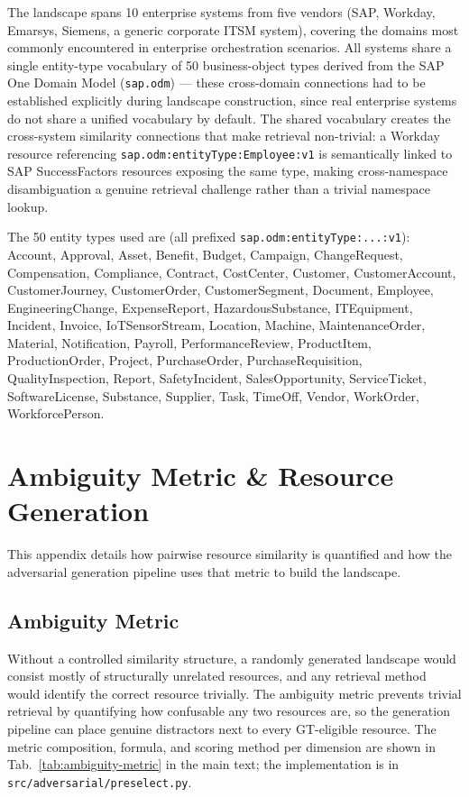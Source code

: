 The landscape spans 10 enterprise systems from five vendors (SAP, Workday, Emarsys, Siemens, a generic corporate ITSM system), covering the domains most commonly encountered in enterprise orchestration scenarios. All systems share a single entity-type vocabulary of 50 business-object types derived from the SAP One Domain Model (\texttt{sap.odm}) --- these cross-domain connections had to be established explicitly during landscape construction, since real enterprise systems do not share a unified vocabulary by default. The shared vocabulary creates the cross-system similarity connections that make retrieval non-trivial: a Workday resource referencing \texttt{sap.odm:entityType:Employee:v1} is semantically linked to SAP SuccessFactors resources exposing the same type, making cross-namespace disambiguation a genuine retrieval challenge rather than a trivial namespace lookup.

The 50 entity types used are (all prefixed \texttt{sap.odm:entityType:...:v1}):
{\footnotesize\ttfamily
Account, Approval, Asset, Benefit, Budget, Campaign, ChangeRequest, Compensation, Compliance, Contract,
CostCenter, Customer, CustomerAccount, CustomerJourney, CustomerOrder, CustomerSegment, Document,
Employee, EngineeringChange, ExpenseReport, HazardousSubstance, ITEquipment, Incident, Invoice,
IoTSensorStream, Location, Machine, MaintenanceOrder, Material, Notification, Payroll,
PerformanceReview, ProductItem, ProductionOrder, Project, PurchaseOrder, PurchaseRequisition,
QualityInspection, Report, SafetyIncident, SalesOpportunity, ServiceTicket, SoftwareLicense,
Substance, Supplier, Task, TimeOff, Vendor, WorkOrder, WorkforcePerson.
}



\section{Ambiguity Metric \& Resource Generation}
\label{appendix:metric-generation}

This appendix details how pairwise resource similarity is quantified and how the adversarial generation pipeline uses that metric to build the landscape.

\subsection{Ambiguity Metric}
\label{appendix:landscape-metric}

Without a controlled similarity structure, a randomly generated landscape would consist mostly of structurally unrelated resources, and any retrieval method would identify the correct resource trivially. The ambiguity metric prevents trivial retrieval by quantifying how confusable any two resources are, so the generation pipeline can place genuine distractors next to every GT-eligible resource. The metric composition, formula, and scoring method per dimension are shown in Tab.~\ref{tab:ambiguity-metric} in the main text; the implementation is in \texttt{src/adversarial/preselect.py}.

